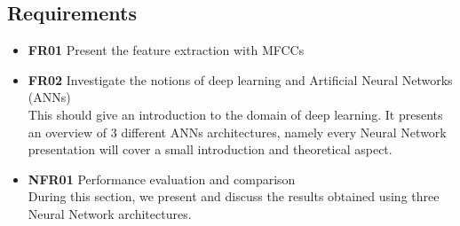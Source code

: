 
\subsection{Requirements}

\begin{itemize} 
  \item \textbf{FR01} Present the feature extraction with MFCCs \\
  \item \textbf{FR02} Investigate the notions of deep learning and Artificial
    Neural Networks (ANNs)\\
    This should give an introduction to the domain of deep learning. It presents
    an overview of 3 different ANNs architectures, namely every Neural Network
    presentation will cover a small introduction and theoretical aspect.\\
  \item \textbf{NFR01} Performance evaluation and comparison\\ 
    During this section, we present and discuss the results obtained using
    three Neural Network architectures.
\end{itemize}
